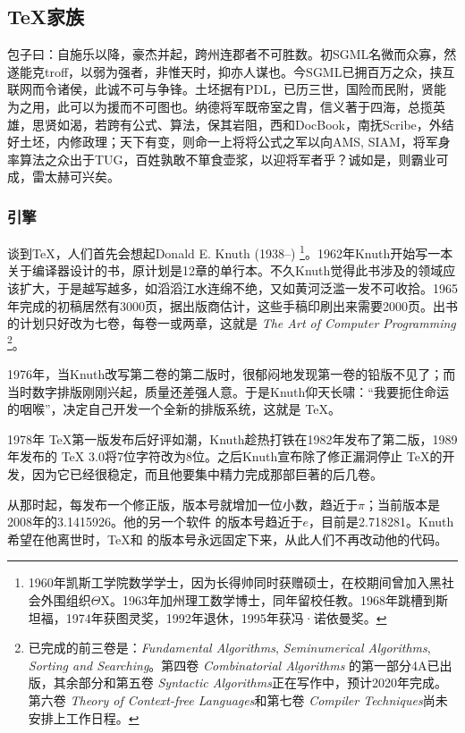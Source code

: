 \subsection{\TeX 家族}
\label{sec:tex}

包子曰：自施乐以降，豪杰并起，跨州连郡者不可胜数。初SGML名微而众寡，然遂能克troff，以弱为强者，非惟天时，抑亦人谋也。今SGML已拥百万之众，挟互联网而令诸侯，此诚不可与争锋。土坯据有PDL，已历三世，国险而民附，贤能为之用，此可以为援而不可图也。纳德将军既帝室之胄，信义著于四海，总揽英雄，思贤如渴，若跨有公式、算法，保其岩阻，西和DocBook，南抚Scribe，外结好土坯，内修政理；天下有变，则命一上将将公式之军以向AMS, SIAM，将军身率算法之众出于TUG，百姓孰敢不箪食壶浆，以迎将军者乎？诚如是，则霸业可成，雷太赫可兴矣。

\subsubsection{引擎}

谈到\TeX{}，人们首先会想起Donald E. Knuth (1938--)\indexKnuth{} \footnote{1960年凯斯工学院数学学士，因为长得帅同时获赠硕士，在校期间曾加入黑社会外围组织$\Theta\mathrm{X}$。1963年加州理工数学博士，同年留校任教。1968年跳槽到斯坦福\indexStanford{}，1974年获图灵奖，1992年退休，1995年获冯·诺依曼奖。}。1962年Knuth开始写一本关于编译器设计的书，原计划是12章的单行本。不久Knuth觉得此书涉及的领域应该扩大，于是越写越多，如滔滔江水连绵不绝，又如黄河泛滥一发不可收拾。1965年完成的初稿居然有3000页，据出版商估计，这些手稿印刷出来需要2000页。出书的计划只好改为七卷，每卷一或两章，这就是 \emph{The Art of Computer Programming} \footnote{已完成的前三卷是：\emph{Fundamental Algorithms}, \emph{Seminumerical Algorithms}, \emph{Sorting and Searching}。第四卷 \emph{Combinatorial Algorithms} 的第一部分4A已出版，其余部分和第五卷 \emph{Syntactic Algorithms}正在写作中，预计2020年完成。第六卷 \emph{Theory of Context-free Languages}和第七卷 \emph{Compiler Techniques}尚未安排上工作日程。}。

1976年，当Knuth改写第二卷的第二版时，很郁闷地发现第一卷的铅版不见了；而当时数字排版刚刚兴起，质量还差强人意。于是Knuth仰天长啸：“我要扼住命运的咽喉”，决定自己开发一个全新的排版系统，这就是 \TeX。

1978年 \TeX 第一版发布后好评如潮，Knuth趁热打铁在1982年发布了第二版，1989年发布的 \TeX{} 3.0将7位字符改为8位。之后Knuth宣布除了修正漏洞停止 \TeX 的开发，因为它已经很稳定，而且他要集中精力完成那部巨著的后几卷。

从那时起，每发布一个修正版，版本号就增加一位小数，趋近于$\pi$；当前版本是2008年的3.1415926。他的另一个软件 \MF 的版本号趋近于$e$，目前是2.718281。Knuth希望在他离世时，\TeX 和 \MF 的版本号永远固定下来，从此人们不再改动他的代码。

